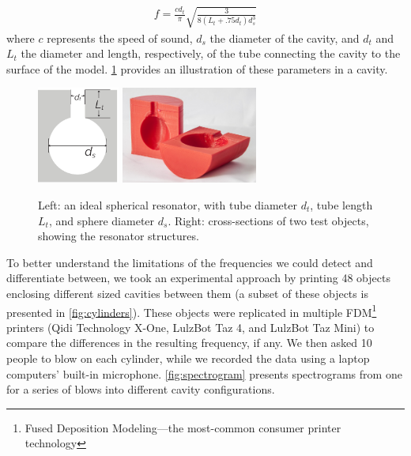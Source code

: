         \begin{align}\label{eq:hhz}
          f = \frac{cd_t}{\pi}\sqrt{\frac{3}{8(L_t+.75 d_t)d_s^3}}
        \end{align}
        where $c$ represents the speed of sound, $d_s$ the diameter of the
        cavity, and $d_t$ and $L_t$ the diameter and length, respectively, of
        the tube connecting the cavity to the surface of the model.
        \cref{fig:resonator} provides an illustration of these parameters in a
        \bh cavity.
        
        \begin{figure}[H]
          \centering
            \includegraphics[height=1.25in]{figures/helmholtz_illustration}
            \quad
            \includegraphics[height=1.25in]{figures/cavities2}
            \caption{Left: an ideal spherical \hhz resonator, with tube diameter
            $d_t$, tube length $L_t$, and sphere diameter $d_s$. Right:
            cross-sections of two \bh test objects, showing the resonator
            structures.}
            \label{fig:resonator}
        \end{figure}
                            
            To better understand the limitations of the frequencies we could
            detect and differentiate between, we took an experimental approach
            by printing 48 objects enclosing different sized cavities between
            them (a subset of these objects is presented in
            \cref{fig:cylinders}).  These objects were replicated in multiple
            FDM\footnote{Fused Deposition Modeling---the most-common consumer
            printer technology} printers (Qidi Technology X-One, LulzBot Taz 4,
            and LulzBot Taz Mini) to compare the differences in the resulting
            frequency, if any. We then asked 10 people to blow on each
            cylinder, while we recorded the data using a laptop computers'
            built-in microphone.  \cref{fig:spectrogram} presents spectrograms
            from one for a series of blows into different cavity
            configurations.
        
